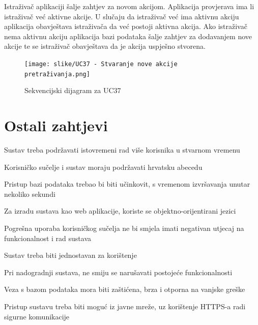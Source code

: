 				\noindent
				Istraživač aplikaciji šalje zahtjev za novom akcijom.
				        Aplikacija provjerava ima li istraživač već aktivne akcije.
        				U slučaju da istraživač već ima aktivnu akciju aplikacija obavještava istraživača da već postoji aktivna akcija.
        				Ako istraživač nema aktivnu akciju aplikacija bazi podataka šalje zahtjev za dodavanjem nove akcije te se
        				istraživač obavještava da je akcija uspješno stvorena.

				

				\begin{figure}[H]
					\texttt{[image: slike/UC37 - Stvaranje nove akcije pretraživanja.png]} %
					\centering
					\caption{Sekvencijski dijagram za UC37}
					\label{fig:UC37 - Stvaranje nove akcije pretraživanja}
				\end{figure}

				\eject
	
		\section{Ostali zahtjevi}

		\begin{packed_item}
			\item Sustav treba podržavati istovremeni rad više korisnika u stvarnom vremenu
			\item Korisničko sučelje i sustav moraju podržavati hrvatsku abecedu 
			\item Pristup bazi podataka trebao bi biti učinkovit, s vremenom izvršavanja unutar nekoliko sekundi
			\item Za izradu sustava kao web aplikacije, koriste se objektno-orijentirani jezici
			\item Pogrešna uporaba korisničkog sučelja ne bi smjela imati negativan utjecaj na funkcionalnost i rad sustava
			\item Sustav treba biti jednostavan za korištenje
			\item Pri nadogradnji sustava, ne smiju se narušavati postojeće funkcionalnosti
			\item Veza s bazom podataka mora biti zaštićena, brza i otporna na vanjske greške
			\item Pristup sustavu treba biti moguć iz javne mreže, uz korištenje HTTPS-a radi sigurne komunikacije
		\end{packed_item}
	